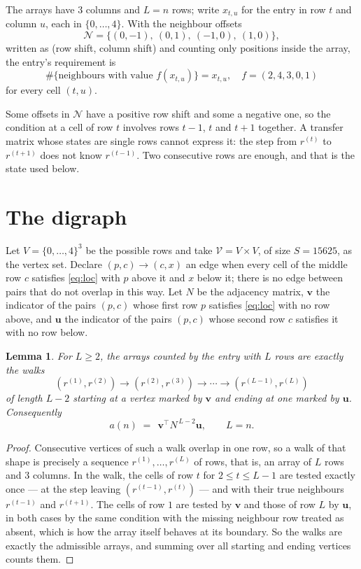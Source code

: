 \documentclass[11pt,a4paper]{article}
\theoremstyle{plain}
\newtheorem{lemma}[theorem]{Lemma}
\theoremstyle{definition}
\begin{document}
The arrays have $3$ columns and $L=n$ rows; write $x_{t,u}$ for the entry in
row $t$ and column $u$, each in $\{0,\dots,4\}$. With the neighbour offsets
\[
\mathcal N=\{(0,-1),\ (0,1),\ (-1,0),\ (1,0)\},
\]
written as (row shift, column shift) and counting only positions inside the array, the
entry's requirement is
\begin{equation}\label{eq:loc}
\#\{\text{neighbours with value }f(x_{t,u})\}=x_{t,u},\quad f=(2,4,3,0,1)
\end{equation}
for every cell $(t,u)$.

Some offsets in $\mathcal N$ have a positive row shift and some a negative one, so the
condition at a cell of row $t$ involves rows $t-1$, $t$ and $t+1$ together. A transfer
matrix whose states are single rows cannot express it: the step from $r^{(t)}$ to
$r^{(t+1)}$ does not know $r^{(t-1)}$. Two consecutive rows are enough, and that is
the state used below.

\section{The digraph}

Let $V=\{0,\dots,4\}^{3}$ be the possible rows and take
$\mathcal V=V\times V$, of size $S=15625$, as the vertex set. Declare $(p,c)\to(c,x)$ an edge
when every cell of the middle row $c$ satisfies \eqref{eq:loc} with $p$ above it and $x$
below it; there is no edge between pairs that do not overlap in this way. Let $N$ be the
adjacency matrix, $\mathbf{v}$ the indicator of the pairs $(p,c)$ whose first row $p$
satisfies \eqref{eq:loc} with no row above, and $\mathbf{u}$ the indicator of
the pairs $(p,c)$ whose second row $c$ satisfies it with no row below.

\begin{lemma}\label{lem:walk}
For $L\ge2$, the arrays counted by the entry with $L$ rows are exactly the walks
\[
(r^{(1)},r^{(2)})\to(r^{(2)},r^{(3)})\to\cdots\to(r^{(L-1)},r^{(L)})
\]
of length $L-2$ starting at a vertex marked by $\mathbf{v}$ and ending at one marked by
$\mathbf{u}$. Consequently
\[
a(n)\;=\;\,\mathbf{v}^{\!\top}N^{\,L-2}\mathbf{u},\qquad L=n .
\]
\end{lemma}

\begin{proof}
Consecutive vertices of such a walk overlap in one row, so a walk of that shape is
precisely a sequence $r^{(1)},\dots,r^{(L)}$ of rows, that is, an array of $L$ rows
and $3$ columns. In the walk, the cells of row $t$ for $2\le t\le L-1$ are tested
exactly once --- at the step leaving $(r^{(t-1)},r^{(t)})$ --- and with their true
neighbours $r^{(t-1)}$ and $r^{(t+1)}$. The cells of row $1$ are tested by
$\mathbf{v}$ and those of row $L$ by $\mathbf{u}$, in both cases by the same condition
with the missing neighbour row treated as absent, which is how the array itself behaves at
its boundary. So the walks are exactly the admissible arrays, and summing over all starting
and ending vertices counts them.
\end{proof}
\end{document}
